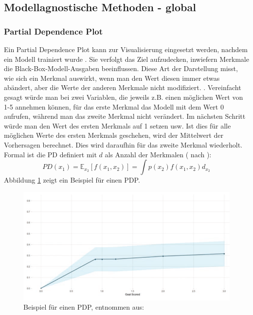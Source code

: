 \subsection{Modellagnostische Methoden - global}
\subsubsection{Partial Dependence Plot}
\label{subsubsec_PDP}
Ein Partial Dependence Plot kann zur Visualisierung eingesetzt werden, nachdem ein Modell trainiert wurde \cite{Gianfagna.2021}. Sie verfolgt das Ziel aufzudecken, inwiefern Merkmale die Black-Box-Modell-Ausgaben beeinflussen. Diese Art der Darstellung misst, wie sich ein Merkmal auswirkt, wenn man den Wert diesen immer etwas abändert, aber die Werte der anderen Merkmale nicht modifiziert. \cite{kamath2021explainable}.
Vereinfacht gesagt würde man bei zwei Variablen, die jeweils z.B. einen möglichen Wert von 1-5 annehmen können, für das erste Merkmal das Modell mit dem Wert 0 aufrufen, während man das zweite Merkmal nicht verändert. Im nächsten Schritt würde man den Wert des ersten Merkmals auf 1 setzen usw. Ist dies für alle möglichen Werte des ersten Merkmals geschehen, wird der Mittelwert der Vorhersagen berechnet. Dies wird daraufhin für das zweite Merkmal wiederholt. 
Formal ist die PD definiert mit $d$ als Anzahl der Merkmalen (\cite{kamath2021explainable} nach \cite{friedman2001greedy}): 
\begin{equation}
    PD(x_{1}) = \mathds{E}_{x_{2}}[f(x_{1},x_{2})] = \int p(x_{2}) f(x_{1},x_{2})d_{x_{2}}
\end{equation}
Abbildung \ref{Fig:PDP_Beispiel} zeigt ein Beispiel für einen PDP. 
\begin{figure}[h]
    \centering
    \includegraphics[scale=0.45]{pic/MA-Bilder/Literaturrecherche/PDP-Beispiel.PNG}
    \caption{Beispiel für einen PDP, entnommen aus: \cite{Gianfagna.2021}}
    \label{Fig:PDP_Beispiel}
\end{figure}

